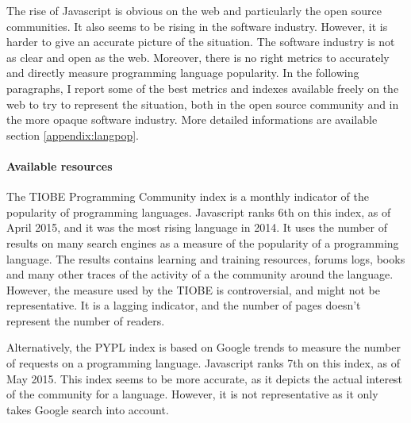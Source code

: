 





The rise of Javascript is obvious on the web and particularly the open source communities.
It also seems to be rising in the software industry.
However, it is harder to give an accurate picture of the situation.
The software industry is not as clear and open as the web.
Moreover, there is no right metrics to accurately and directly measure programming language popularity.
In the following paragraphs, I report some of the best metrics and indexes available freely on the web to try to represent the situation, both in the open source community and in the more opaque software industry.
More detailed informations are available section \ref{appendix:langpop}.

\paragraph{Available resources}

The TIOBE Programming Community index is a monthly indicator of the popularity of programming languages.
Javascript ranks 6th on this index, as of April 2015, and it was the most rising language in 2014.
It uses the number of results on many search engines as a measure of the popularity of a programming language.
The results contains learning and training resources, forums logs, books and many other traces of the activity of a the community around the language.
However, the measure used by the TIOBE is controversial, and might not be representative.
It is a lagging indicator, and the number of pages doesn't represent the number of readers.

Alternatively, the PYPL index is based on Google trends to measure the number of requests on a programming language.
Javascript ranks 7th on this index, as of May 2015.
This index seems to be more accurate, as it depicts the actual interest of the community for a language.
However, it is not representative as it only takes Google search into account.

